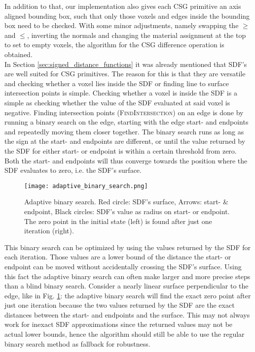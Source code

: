 In addition to that, our implementation also gives each CSG primitive an axis aligned bounding box, such that only those voxels and edges inside the bounding box need to be checked. With some minor adjustments, namely swapping the $\geq$ and $\leq$, inverting the normals and changing the material assignment at the top to set to empty voxels, the algorithm for the CSG difference operation is obtained.\\
In Section \ref{sec:signed_distance_functions} it was already mentioned that SDF's are well suited for CSG primitives.
The reason for this is that they are versatile and checking whether a voxel lies inside the SDF or finding
line to surface intersection points is simple. Checking whether a voxel is inside the SDF is a simple as checking whether the value of the SDF evaluated at said voxel is negative.
Finding intersection points (\textsc{FindIntersection}) on an edge is done by running a binary search on the edge, starting with the edge start- and endpoints and repeatedly moving them closer together.
The binary search runs as long as the sign at the start- and endpoints are different, or until the value returned by the SDF for either start- or endpoint is within a certain threshold from zero. Both the start- and endpoints will thus converge towards the position where the SDF evaluates to zero, i.e. the SDF's surface.\\

\begin{figure}
\centering
\captionsetup{width=0.8\textwidth}
\texttt{[image: adaptive\_binary\_search.png]}
\caption{Adaptive binary search. Red circle: SDF's surface, Arrows: start- \& endpoint, Black circles: SDF's value as radius on start- or endpoint. The zero point in the initial state (left) is found after just one iteration (right).}
\label{fig:adaptive_binary_search}
\end{figure}

This binary search can be optimized by using the values returned by the SDF for each iteration. Those values are a lower bound of the distance the start- or endpoint can be moved without accidentally crossing the SDF's surface. Using this fact the adaptive binary search can often make larger and more precise steps than a blind binary search. Consider a nearly linear surface perpendicular to the edge, like in Fig. \ref{fig:adaptive_binary_search}: the adaptive binary search will find the exact zero point after just one iteration because the two values returned by the SDF are the exact distances between the start- and endpoints and the surface. This may not always work for inexact SDF approximations since the returned values may not be actual lower bounds, hence the algorithm should still be able to use the regular binary search method as fallback for robustness.

